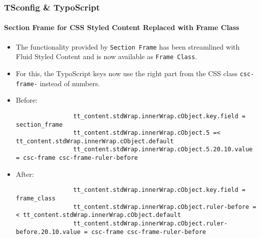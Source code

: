 
\begin{frame}[fragile]
	\frametitle{TSconfig \& TypoScript}
	\framesubtitle{Section Frame for CSS Styled Content Replaced with Frame Class}

	\lstset{basicstyle=\tiny\ttfamily}

	\begin{itemize}
		\item The functionality provided by \texttt{Section Frame} has been streamlined with Fluid Styled Content and is now available as \texttt{Frame Class}.
		\item For this, the TypoScript keys now use the right part from the CSS class \texttt{csc-frame-} instead of numbers.
		\item Before:

			\begin{lstlisting}
				tt_content.stdWrap.innerWrap.cObject.key.field = section_frame
				tt_content.stdWrap.innerWrap.cObject.5 =< tt_content.stdWrap.innerWrap.cObject.default
				tt_content.stdWrap.innerWrap.cObject.5.20.10.value = csc-frame csc-frame-ruler-before
			\end{lstlisting}

		\item After:

			\begin{lstlisting}
				tt_content.stdWrap.innerWrap.cObject.key.field = frame_class
				tt_content.stdWrap.innerWrap.cObject.ruler-before =< tt_content.stdWrap.innerWrap.cObject.default
				tt_content.stdWrap.innerWrap.cObject.ruler-before.20.10.value = csc-frame csc-frame-ruler-before
			\end{lstlisting}

	\end{itemize}

\end{frame}

